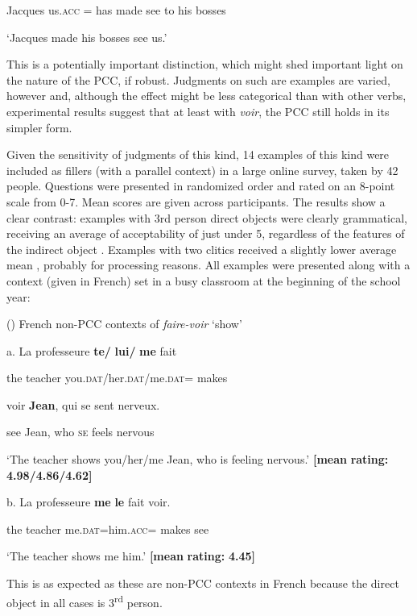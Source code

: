 \documentclass[output=paper,modfonts,nonflat]{langsci/langscibook}
\begin{document}
    Jacques us.\textsc{acc} =  has   made see   to his bosses

    ‘Jacques made his bosses see us.’

This is a potentially important distinction, which might shed important light on the nature of the PCC, if robust. Judgments on such are examples are varied, however and, although the effect might be less categorical than with other verbs, experimental results suggest that at least with \textit{voir}, the PCC still holds in its simpler form.

Given the sensitivity of judgments of this kind, 14 examples of this kind were included as fillers (with a parallel context) in a large online survey, taken by 42 people. Questions were presented in randomized order and rated on an 8-point scale from 0-7. Mean scores are given across participants. The results show a clear contrast: examples with 3rd person direct objects were clearly grammatical, receiving an average of acceptability of just under 5, regardless of the features of the indirect object . Examples with two clitics received a slightly lower average mean , probably for processing reasons. All examples were presented along with a context (given in French) set in a busy classroom at the beginning of the school year:

()  French non-PCC contexts of \textit{faire-voir} ‘show’ 

  a.   La   professeure   \textbf{te/}  \textbf{lui/}  \textbf{me}     fait    

    the   teacher   you.\textsc{dat}/her.\textsc{dat}/me.\textsc{dat}= makes 

    voir \textbf{Jean},  qui   se   sent   nerveux. 

    see   Jean,   who \textsc{se}   feels   nervous

  ‘The teacher shows you/her/me Jean, who is feeling nervous.’        \textbf{[mean} \textbf{rating:} \textbf{4.98/4.86/4.62]}

b.   La   professeure   \textbf{me}   \textbf{le}  fait  voir.   

    the   teacher  me.\textsc{dat=}him.\textsc{acc=}  makes  see

    ‘The teacher shows me him.’   \textbf{[mean} \textbf{rating:} \textbf{4.45]}

This is as expected as these are non-PCC contexts in French because the direct object in all cases is 3\textsuperscript{rd} person. 
\end{document}
